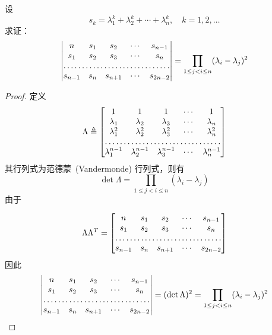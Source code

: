\documentclass[twoside,openright]{book}
\begin{document}
\begin{CJK*}{UTF8}{}
\begin{quest}
\label{quest:79}
设
\[
s_k = \lambda_{1}^k + \lambda_{2}^k + \dotsm + \lambda_{n}^k,\quad k = 1,2,\dotsc
\]
求证：
\[
\begin{vmatrix}
n        & s_1      & s_2    & \dotsm & s_{n-1}   \\
s_1      & s_2      & s_3    & \dotsm & s_{n}     \\
\hdotsfor{5}                                      \\
s_{n-1}  & s_{n}    & s_{n+1}& \dotsm & s_{2n-2}
\end{vmatrix}=
\prod_{1 \le j < i \le n} (\lambda_i - \lambda_j)^2
\]
\end{quest}
\begin{proof}
定义
\[
\Lambda \triangleq
\begin{bmatrix}
1               & 1               & 1               & \dotsm & 1                 \\
\lambda_1       & \lambda_2       & \lambda_3       & \dotsm & \lambda_{n}       \\
\lambda_1^2     & \lambda_2^2     & \lambda_3^2     & \dotsm & \lambda_{n}^2     \\
\hdotsfor{5}                                                                     \\
\lambda_1^{n-1} & \lambda_2^{n-1} & \lambda_3^{n-1} & \dotsm & \lambda_{n}^{n-1}
\end{bmatrix}
\]
其行列式为范德蒙\ (Vandermonde) 行列式，则有
\[ \det \Lambda = \prod_{1 \le j < i \le n} (\lambda_i - \lambda_j) \]
由于

\[
\Lambda \Lambda^T =
\begin{bmatrix}
n        & s_1      & s_2    & \dotsm & s_{n-1}   \\
s_1      & s_2      & s_3    & \dotsm & s_{n}     \\
\hdotsfor{5}                                      \\
s_{n-1}  & s_{n}    & s_{n+1}& \dotsm & s_{2n-2}
\end{bmatrix}
\]
因此
\[
\begin{vmatrix}
n        & s_1      & s_2    & \dotsm & s_{n-1}   \\
s_1      & s_2      & s_3    & \dotsm & s_{n}     \\
\hdotsfor{5}                                      \\
s_{n-1}  & s_{n}    & s_{n+1}& \dotsm & s_{2n-2}
\end{vmatrix}=(\det \Lambda )^2=
\prod_{1 \le j < i \le n} (\lambda_i - \lambda_j)^2
\]
\end{proof}


\end{CJK*}
\end{document}
